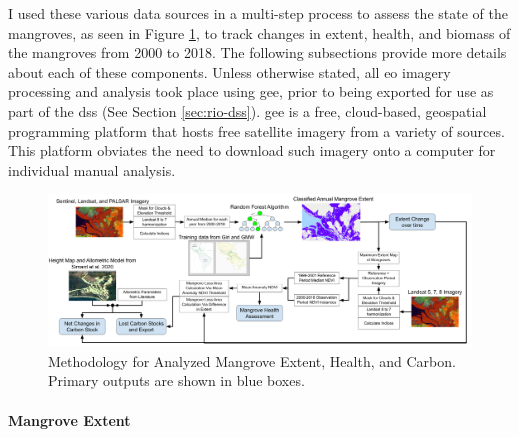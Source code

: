 I used these various data sources in a multi-step process to assess the state of the mangroves, as seen in Figure \ref{fig:extent_method}, to track changes in extent, health, and biomass of the mangroves from 2000 to 2018. The following subsections provide more details about each of these components. Unless otherwise stated, all \ac{eo} imagery processing and analysis took place using \acf{gee}, prior to being exported for use as part of the \ac{dss} (See Section \ref{sec:rio-dss}). \ac{gee} is a free, cloud-based, geospatial programming platform that hosts free satellite imagery from a variety of sources. This platform obviates the need to download such imagery onto a computer for individual manual analysis.

\begin{landscape}
\begin{figure}[t]
	\centering
	\includegraphics[width=1.3\textwidth]{Figures/chap4/extent_method.png}
	\caption[Mangrove Analysis Methodology]{Methodology for Analyzed Mangrove Extent, Health, and Carbon. Primary outputs are shown in blue boxes.}
	\label{fig:extent_method}
\end{figure}
\end{landscape}

\paragraph{Mangrove Extent} \label{sec:rio-mangrove-extent} \leavevmode\newline


